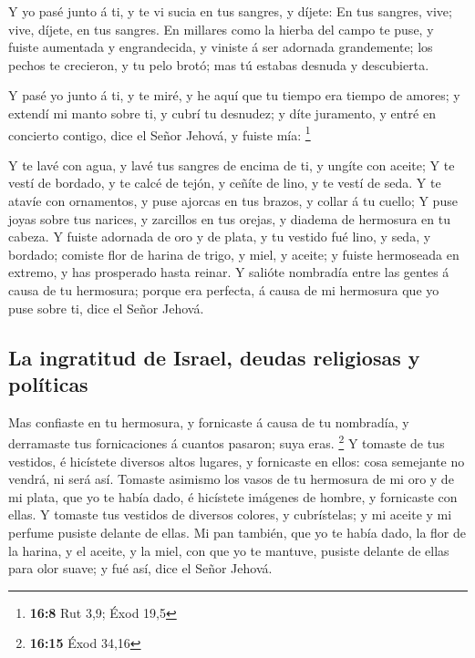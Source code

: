  Y yo pasé junto á ti, y te vi sucia en tus sangres, y
díjete: En tus sangres, vive; vive, díjete, en tus sangres. 
En millares como la hierba del campo te puse, y fuiste aumentada y
engrandecida, y viniste á ser adornada grandemente; los pechos te
crecieron, y tu pelo brotó; mas tú estabas desnuda y descubierta.

 Y pasé yo junto á ti, y te miré, y he aquí que tu tiempo
era tiempo de amores; y extendí mi manto sobre ti, y cubrí tu desnudez;
y díte juramento, y entré en concierto contigo, dice el Señor Jehová, y
fuiste mía: \footnote{\textbf{16:8} Rut 3,9; Éxod 19,5}

 Y te lavé con agua, y lavé tus sangres de encima de ti, y
ungíte con aceite;  Y te vestí de bordado, y te calcé de
tejón, y ceñíte de lino, y te vestí de seda.  Y te atavíe
con ornamentos, y puse ajorcas en tus brazos, y collar á tu cuello;
 Y puse joyas sobre tus narices, y zarcillos en tus orejas,
y diadema de hermosura en tu cabeza.  Y fuiste adornada de
oro y de plata, y tu vestido fué lino, y seda, y bordado; comiste flor
de harina de trigo, y miel, y aceite; y fuiste hermoseada en extremo, y
has prosperado hasta reinar.  Y salióte nombradía entre las
gentes á causa de tu hermosura; porque era perfecta, á causa de mi
hermosura que yo puse sobre ti, dice el Señor Jehová.

\hypertarget{la-ingratitud-de-israel-deudas-religiosas-y-poluxedticas}{%
\subsection{La ingratitud de Israel, deudas religiosas y
políticas}\label{la-ingratitud-de-israel-deudas-religiosas-y-poluxedticas}}

 Mas confiaste en tu hermosura, y fornicaste á causa de tu
nombradía, y derramaste tus fornicaciones á cuantos pasaron; suya eras.
\footnote{\textbf{16:15} Éxod 34,16}  Y tomaste de tus
vestidos, é hicístete diversos altos lugares, y fornicaste en ellos:
cosa semejante no vendrá, ni será así.  Tomaste asimismo
los vasos de tu hermosura de mi oro y de mi plata, que yo te había dado,
é hicístete imágenes de hombre, y fornicaste con ellas.  Y
tomaste tus vestidos de diversos colores, y cubrístelas; y mi aceite y
mi perfume pusiste delante de ellas.  Mi pan también, que
yo te había dado, la flor de la harina, y el aceite, y la miel, con que
yo te mantuve, pusiste delante de ellas para olor suave; y fué así, dice
el Señor Jehová.

